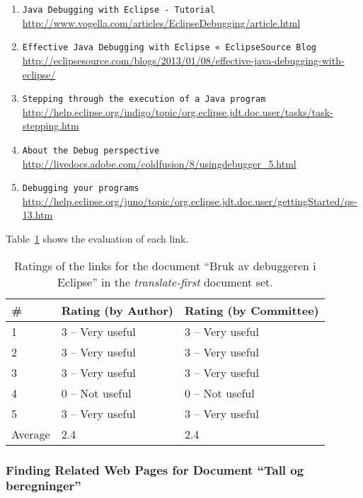\begin{enumerate}
\item
    \verb|Java Debugging with Eclipse - Tutorial| \\
    \url{http://www.vogella.com/articles/EclipseDebugging/article.html}
\item
    \verb|Effective Java Debugging with Eclipse « EclipseSource Blog| \\
    \url{http://eclipsesource.com/blogs/2013/01/08/effective-java-debugging-with-eclipse/}
\item
    \verb|Stepping through the execution of a Java program| \\
    \url{http://help.eclipse.org/indigo/topic/org.eclipse.jdt.doc.user/tasks/task-stepping.htm}
\item
    \verb|About the Debug perspective| \\
    \url{http://livedocs.adobe.com/coldfusion/8/usingdebugger_5.html}
\item
    \verb|Debugging your programs| \\
    \url{http://help.eclipse.org/juno/topic/org.eclipse.jdt.doc.user/gettingStarted/qs-13.htm}
\end{enumerate}

Table~\ref{tab:ratings-en-bruk-av-debuggeren-i-eclipse-2} shows the evaluation of each link.
\begin{table}[H]
\centering
\begin{tabular}{|l|l|l|}
\hline\hline
    \# & Rating (by Author) & Rating (by Committee) \\
\hline
    1 & 3 -- Very useful & 3 -- Very useful \\
    2 & 3 -- Very useful & 3 -- Very useful \\
    3 & 3 -- Very useful & 3 -- Very useful \\
    4 & 0 -- Not useful & 0 -- Not useful \\
    5 & 3 -- Very useful & 3 -- Very useful \\
\hline
    Average & 2.4 & 2.4 \\
\hline\hline
\end{tabular}
\caption{Ratings of the links for the document ``Bruk av debuggeren i Eclipse'' in the \textit{translate-first} document set.}
\label{tab:ratings-en-bruk-av-debuggeren-i-eclipse-2}
\end{table}


\subsubsection{Finding Related Web Pages for Document ``Tall og beregninger''}
\label{subsubsec:no-tall-og-beregninger-2}

